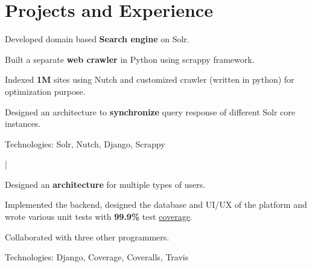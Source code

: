 \documentclass[a4paper]{deedy-resume-openfont}
\begin{document}
\hfill
\begin{minipage}[t]{0.63\textwidth} 

\section{Projects and Experience}

\vspace{\topsep}
\begin{tightemize}
\item Developed domain based \textbf{Search engine} on Solr.
\item Built a separate \textbf{web crawler} in Python using scrappy framework.
\item Indexed \textbf{1M} sites using Nutch and customized crawler (written in python) for optimization purpose.
\item Designed an architecture to \textbf{synchronize} query response of different Solr core instances.
\item Technologies: Solr, Nutch, Django, Scrappy%
\end{tightemize}
\sectionsep


 | 
\begin{tightemize}
\item Designed an \textbf{architecture} for multiple types of users.
\item Implemented the backend, designed the database and UI/UX of the platform and wrote various unit tests with \textbf{99.9\%} test \href{https://coveralls.io/github/hirenchalodiya1/agrisync}{coverage}.
\item Collaborated with three other programmers.
\item Technologies: Django, Coverage, Coveralls, Travis
\end{tightemize}
\sectionsep


\end{minipage}
\end{document}
